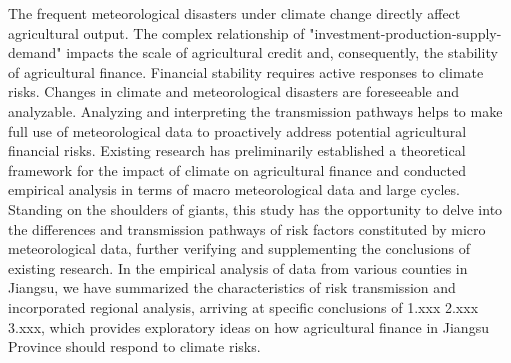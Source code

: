 \begin{abstracten}
The frequent meteorological disasters under climate change directly affect agricultural output. The complex relationship of "investment-production-supply-demand" impacts the scale of agricultural credit and, consequently, the stability of agricultural finance. Financial stability requires active responses to climate risks. Changes in climate and meteorological disasters are foreseeable and analyzable. Analyzing and interpreting the transmission pathways helps to make full use of meteorological data to proactively address potential agricultural financial risks. Existing research has preliminarily established a theoretical framework for the impact of climate on agricultural finance and conducted empirical analysis in terms of macro meteorological data and large cycles. Standing on the shoulders of giants, this study has the opportunity to delve into the differences and transmission pathways of risk factors constituted by micro meteorological data, further verifying and supplementing the conclusions of existing research. In the empirical analysis of data from various counties in Jiangsu, we have summarized the characteristics of risk transmission and incorporated regional analysis, arriving at specific conclusions of 1.xxx 2.xxx 3.xxx, which provides exploratory ideas on how agricultural finance in Jiangsu Province should respond to climate risks.
\end{abstracten}
